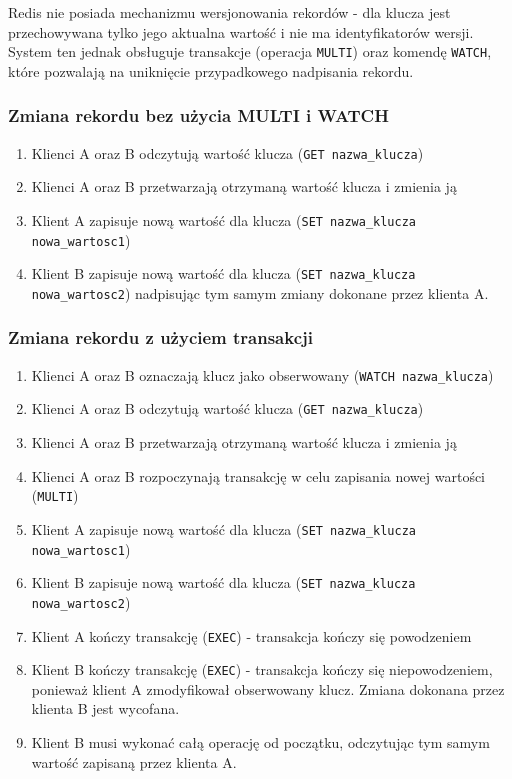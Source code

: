 Redis nie posiada mechanizmu wersjonowania rekordów - dla klucza jest przechowywana tylko jego aktualna wartość i nie ma identyfikatorów wersji.
System ten jednak obsługuje transakcje (operacja \verb+MULTI+) oraz komendę \verb+WATCH+, które pozwalają na uniknięcie przypadkowego nadpisania rekordu.

\subsubsection*{Zmiana rekordu bez użycia MULTI i WATCH}

\begin{enumerate}
 \item Klienci A oraz B odczytują wartość klucza (\verb+GET nazwa_klucza+)
 \item Klienci A oraz B przetwarzają otrzymaną wartość klucza i zmienia ją
 \item Klient A zapisuje nową wartość dla klucza (\verb+SET nazwa_klucza nowa_wartosc1+)
 \item Klient B zapisuje nową wartość dla klucza (\verb+SET nazwa_klucza nowa_wartosc2+) nadpisując tym samym zmiany dokonane przez klienta A.
\end{enumerate}

\subsubsection*{Zmiana rekordu z użyciem transakcji}

\begin{enumerate}
 \item Klienci A oraz B oznaczają klucz jako obserwowany (\verb+WATCH nazwa_klucza+)
 \item Klienci A oraz B odczytują wartość klucza (\verb+GET nazwa_klucza+)
 \item Klienci A oraz B przetwarzają otrzymaną wartość klucza i zmienia ją
 \item Klienci A oraz B rozpoczynają transakcję w celu zapisania nowej wartości (\verb+MULTI+)
 \item Klient A zapisuje nową wartość dla klucza (\verb+SET nazwa_klucza nowa_wartosc1+)
 \item Klient B zapisuje nową wartość dla klucza (\verb+SET nazwa_klucza nowa_wartosc2+)
 \item Klient A kończy transakcję (\verb+EXEC+) - transakcja kończy się powodzeniem
 \item Klient B kończy transakcję (\verb+EXEC+) - transakcja kończy się niepowodzeniem, ponieważ klient A zmodyfikował obserwowany klucz.
 Zmiana dokonana przez klienta B jest wycofana.
 \item Klient B musi wykonać całą operację od początku, odczytując tym samym wartość zapisaną przez klienta A.
\end{enumerate}

